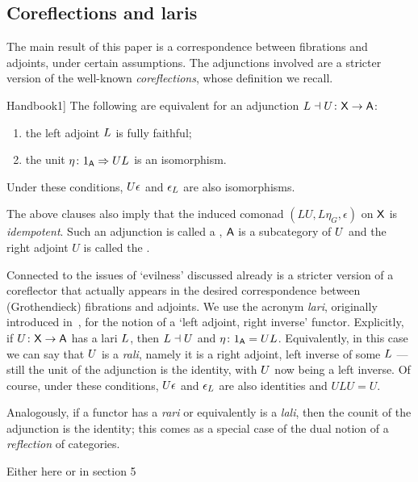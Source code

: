 \documentclass{amsart}
\begin{document}
\subsection*{Coreflections and laris}

The main result of this paper is a correspondence between fibrations and adjoints, under certain assumptions. The adjunctions involved are a stricter version of the well-known \emph{coreflections}, whose definition we recall. %

\begin{prop}[\cite[Prop.~3.4.1]{Handbook1}]\label{prop:coreflection}
The following are equivalent for an adjunction $L\dashv U\colon\mathsf{X}\to\mathsf{A}$:
 \begin{enumerate}
  \item the left adjoint $L$ is fully faithful;
  \item the unit $\eta\colon1_{\mathsf{A}}\Rightarrow UL$ is an isomorphism.
 \end{enumerate}
Under these conditions, $U\epsilon$ and $\epsilon_L$ are also isomorphisms.
\end{prop}

The above clauses also imply that the induced comonad $(LU,L\eta_G,\epsilon)$ on $\mathsf{X}$ is \emph{idempotent}. Such an adjunction is called a , $\mathsf{A}$ is a  subcategory of $U$ and the right adjoint $U$ is called the .

Connected to the issues of `evilness' discussed already is a stricter version of a coreflector that actually appears in the desired correspondence between (Gro\-the\-ndi\-eck) fibrations and adjoints.
We use the acronym \emph{lari}, originally introduced in~\cite{Grayfibredandcofibred}, for the notion of a `left adjoint, right inverse' functor. Explicitly, if $U\colon\mathsf{X}\to\mathsf{A}$ has a lari $L$, then $L\dashv U$ and $\eta\colon1_{\mathsf{A}}=UL$. Equivalently, in this case we can say that $U$ is a \emph{rali}, namely it is a right adjoint, left inverse of some $L$ --- still the unit of the adjunction is the identity, with $U$ now being a left inverse. Of course, under these conditions, $U\epsilon$ and $\epsilon_L$ are also identities and $ULU=U$.

Analogously, if a functor has a \emph{rari} or equivalently is a \emph{lali}, then the counit of the adjunction is the identity; this comes as a special case of the dual notion of a \emph{reflection} of categories.

{\chris Either here or in section 5}
\end{document}
